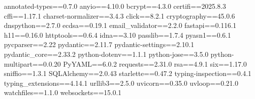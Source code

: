 annotated-types==0.7.0
anyio==4.10.0
bcrypt==4.3.0
certifi==2025.8.3
cffi==1.17.1
charset-normalizer==3.4.3
click==8.2.1
cryptography==45.0.6
dnspython==2.7.0
ecdsa==0.19.1
email_validator==2.2.0
fastapi==0.116.1
h11==0.16.0
httptools==0.6.4
idna==3.10
passlib==1.7.4
pyasn1==0.6.1
pycparser==2.22
pydantic==2.11.7
pydantic-settings==2.10.1
pydantic_core==2.33.2
python-dotenv==1.1.1
python-jose==3.5.0
python-multipart==0.0.20
PyYAML==6.0.2
requests==2.31.0
rsa==4.9.1
six==1.17.0
sniffio==1.3.1
SQLAlchemy==2.0.43
starlette==0.47.2
typing-inspection==0.4.1
typing_extensions==4.14.1
urllib3==2.5.0
uvicorn==0.35.0
uvloop==0.21.0
watchfiles==1.1.0
websockets==15.0.1
